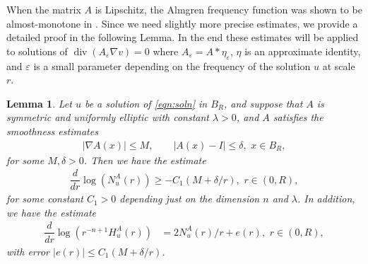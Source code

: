 \documentclass[12pt,leqno]{amsart}
\numberwithin{equation}{section}
\newtheorem{lemma}{Lemma}[section]
\theoremstyle{definition}
\renewcommand{\epsilon}{\varepsilon}
\newcommand{\abs}[1]{\left \lvert #1 \right \rvert}
\DeclareMathOperator{\divv}{\mathrm{div}}
\begin{document}
	
	When the matrix $A$ is Lipschitz, the Almgren frequency function was shown to be almost-monotone in \cite{GL86}. Since we need slightly more precise estimates, we provide a detailed proof in the following Lemma. In the end these estimates will be applied to solutions of $\divv( A_\epsilon \nabla v) = 0$ where $A_\epsilon = A * \eta_\epsilon$, $\eta$ is an approximate identity, and $\epsilon$ is a small parameter depending on the frequency of the solution $u$ at scale $r$. 
	\begin{lemma}\label{lem:almost_monoton}
		Let $u$ be a solution of \eqref{eqn:soln} in $B_R$, and suppose that $A$ is symmetric and uniformly elliptic with constant $\lambda >0$, and $A$ satisfies the smoothness estimates 
		\begin{align*}
			\abs{\nabla A(x)} \le M, \qquad \abs{A(x) - I } \le \delta, \, \, x \in B_R, 
		\end{align*}
		for some $ M, \delta >0$. Then we have the estimate 
		\begin{align*}
			\dfrac{d}{dr}  \log \left(   N_u^A(r) \right) \ge - C_1 ( M + \delta/r), \, \, r \in (0,R),
		\end{align*}
		for some constant $C_1 >0$ depending just on the dimension $n$ and $\lambda$. In addition, we have the estimate
		\begin{align*}
			\dfrac{d}{dr} \log( r^{-n+1} H_u^A(r)) & =  2 N_u^A(r)/r + e(r), \, \, r \in (0, R),
		\end{align*}
		with error $\abs{e(r)} \le C_1 ( M + \delta/r)$. 
	\end{lemma}
\end{document}
